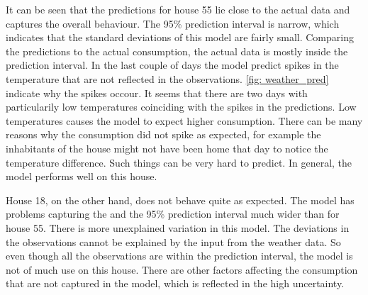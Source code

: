 \noindent It can be seen that the predictions for house 55 lie close to the actual data and captures the overall behaviour.  The 95\% prediction interval is narrow, which indicates that the standard deviations of this model are fairly small. Comparing the predictions to the actual consumption, the actual data is mostly inside the prediction interval. In the last couple of days the model predict spikes in the temperature that are not reflected in the observations. \cref{fig: weather_pred} indicate why the spikes occour. It seems that there are two days with particularily low temperatures coinciding with the spikes in the predictions. Low temperatures causes the model to expect higher consumption. There can be many reasons why the consumption did not spike as expected, for example the inhabitants of the house might not have been home that day to notice the temperature difference. Such things can be very hard to predict. In general, the model performs well on this house. 

\noindent House 18, on the other hand, does not behave quite as expected. The model has problems capturing the and the 95\% prediction interval much wider than for house 55. There is more unexplained variation in this model. The deviations in the observations cannot be explained by the input from the weather data. So even though all the observations are within the prediction interval, the model is not of much use on this house. There are other factors affecting the consumption that are not captured in the model, which is reflected in the high uncertainty.\\

